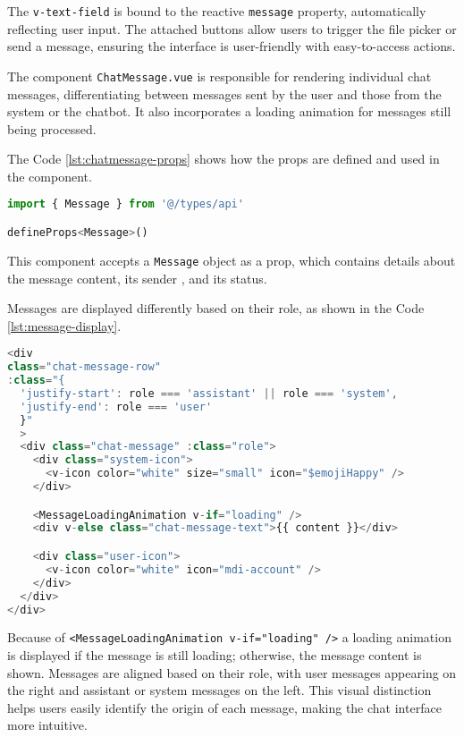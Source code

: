 The \texttt{v-text-field} is bound to the reactive \texttt{message}
property, automatically reflecting user input. The attached buttons allow users to trigger the file picker or send a
message, ensuring the interface is user-friendly with easy-to-access actions.

The component \texttt{ChatMessage.vue} is responsible for rendering individual chat messages, differentiating between
messages sent by the user and those from the system or the chatbot. It also incorporates a loading animation for
messages still being processed.

The Code \ref{lst:chatmessage-props} shows how the props are defined and used in the component.

\begin{lstlisting}[language=JavaScript, caption={Defining Message Props (\texttt{ChatMessage.vue})},
firstnumber=2,label={lst:chatmessage-props}]
import { Message } from '@/types/api'

defineProps<Message>()
\end{lstlisting}

This component accepts a \texttt{Message} object as a prop, which contains details about the message content, its sender
, and its status.

Messages are displayed differently based on their role, as shown in the Code \ref{lst:message-display}.

\begin{lstlisting}[language=JavaScript, caption={Message Display Based on Role (\texttt{ChatMessage.vue})},
firstnumber=8,label={lst:message-display}]
<div
class="chat-message-row"
:class="{
  'justify-start': role === 'assistant' || role === 'system',
  'justify-end': role === 'user'
  }"
  >
  <div class="chat-message" :class="role">
    <div class="system-icon">
      <v-icon color="white" size="small" icon="$emojiHappy" />
    </div>

    <MessageLoadingAnimation v-if="loading" />
    <div v-else class="chat-message-text">{{ content }}</div>

    <div class="user-icon">
      <v-icon color="white" icon="mdi-account" />
    </div>
  </div>
</div>
\end{lstlisting}

Because of \texttt{<MessageLoadingAnimation v-if="loading" />} a loading animation is displayed if the message is still
loading; otherwise, the message content is shown. Messages are aligned based on their role, with user messages appearing
on the right and assistant or system messages on the left. This visual distinction helps users easily identify the
origin of each message, making the chat interface more intuitive.

